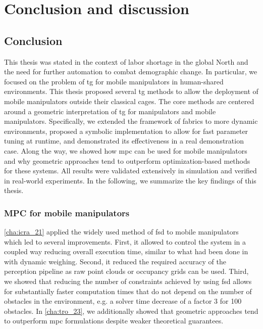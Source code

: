\chapter{Conclusion and discussion}
\label{cha:conclusion}

\acresetall



\newpage

\section{Conclusion}
\label{sec:conclusion}

This thesis was stated in the context of labor shortage in the global North and
the need for further automation to combat demographic change. In particular, we
focused on the problem of \ac{tg} for mobile manipulators in human-shared
environments. This thesis proposed several \ac{tg} methods to allow the
deployment of mobile manipulators outside their classical cages.
The core methods are centered around a
geometric interpretation of \ac{tg} for
manipulators and mobile manipulators. Specifically, we extended the framework of
\ac{fabrics} to more dynamic environments, proposed a symbolic implementation to
allow for fast parameter tuning at runtime, and demonstrated its effectiveness
in a real demonstration case. Along the way, we showed how \ac{mpc} can be used
for mobile manipulators and why geometric approaches tend to outperform
optimization-based methods for these systems. All results were validated
extensively in simulation and verified in real-world experiments. In the
following, we summarize the key findings of this thesis.

\subsection{MPC for mobile manipulators}
\label{sec:conclusion_mpc}

\cref{cha:icra_21} applied the widely used method of \ac{fsd} to mobile
manipulators which led to several improvements. First, it allowed to control the
system in a coupled way reducing overall execution time, similar to what had
been done in \cite{Avanzini2018} with dynamic weighing. Second, it reduced the
required accuracy of the perception pipeline as raw point clouds or occupancy
grids can be used. Third, we showed that reducing the number of constraints
achieved by using \ac{fsd} allows for substantially faster computation times
that do not depend on the number of obstacles in the environment, e.g. a solver
time decrease of a factor 3 for 100 obstacles. In
\cref{cha:tro_23}, we additionally showed that geometric approaches tend to
outperform \ac{mpc} formulations despite weaker theoretical guarantees.

